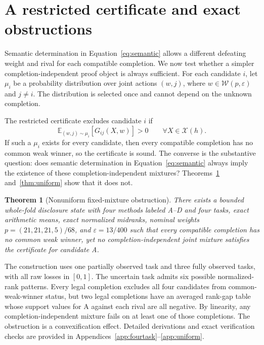 \documentclass[preprint,11pt]{elsarticle}
\newtheorem{theorem}{Theorem}
\begin{document}
\section{A restricted certificate and exact obstructions}

Semantic determination in Equation~\eqref{eq:semantic} allows a different defeating weight and rival for each compatible completion. We now test whether a simpler completion-independent proof object is always sufficient. For each candidate $i$, let $\mu_i$ be a probability distribution over joint actions $(w,j)$, where $w\in\mathcal W(p,\varepsilon)$ and $j\ne i$. The distribution is selected once and cannot depend on the unknown completion.

The restricted certificate excludes candidate $i$ if
\begin{equation}\label{eq:certificate}
\mathbb E_{(w,j)\sim\mu_i}\!\left[G_{ij}(X,w)\right]>0\qquad \forall X\in\mathcal X(h).
\end{equation}
If such a $\mu_i$ exists for every candidate, then every compatible completion has no common weak winner, so the certificate is sound. The converse is the substantive question: does semantic determination in Equation~\eqref{eq:semantic} always imply the existence of these completion-independent mixtures? Theorems~\ref{thm:nonuniform} and~\ref{thm:uniform} show that it does not.

\begin{theorem}[Nonuniform fixed-mixture obstruction]\label{thm:nonuniform}
There exists a bounded whole-fold disclosure state with four methods labeled A--D and four tasks, exact arithmetic means, exact normalized midranks, nominal weights $p=(21,21,21,5)/68$, and $\varepsilon=13/400$ such that every compatible completion has no common weak winner, yet no completion-independent joint mixture satisfies the certificate for candidate A.
\end{theorem}

The construction uses one partially observed task and three fully observed tasks, with all raw losses in $[0,1]$. The uncertain task admits six possible normalized-rank patterns. Every legal completion excludes all four candidates from common-weak-winner status, but two legal completions have an averaged rank-gap table whose support values for A against each rival are all negative. By linearity, any completion-independent mixture fails on at least one of those completions. The obstruction is a convexification effect. Detailed derivations and exact verification checks are provided in Appendices~\ref{app:fourtask}--\ref{app:uniform}.
\end{document}
